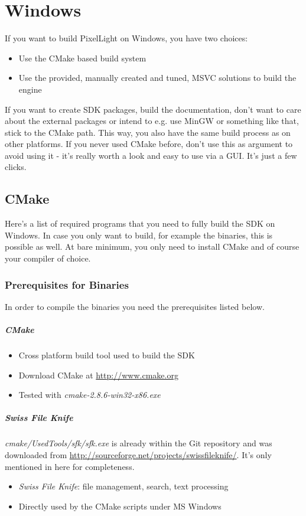 \chapter{Windows}
If you want to build PixelLight on Windows, you have two choices:
\begin{itemize}
\item{Use the CMake based build system}
\item{Use the provided, manually created and tuned, \ac{MSVC} solutions to build the engine}
\end{itemize}

If you want to create \ac{SDK} packages, build the documentation, don't want to care about the external packages or intend to e.g. use MinGW or something like that, stick to the CMake path. This way, you also have the same build process as on other platforms. If you never used CMake before, don't use this as argument to avoid using it - it's really worth a look and easy to use via a \ac{GUI}. It's just a few clicks.




\section{CMake}
Here's a list of required programs that you need to fully build the \ac{SDK} on Windows. In case you only want to build, for example the binaries, this is possible as well. At bare minimum, you only need to install CMake and of course your compiler of choice.



\subsection{Prerequisites for Binaries}
In order to compile the binaries you need the prerequisites listed below.


\paragraph{CMake}
\begin{itemize}
\item{Cross platform build tool used to build the \ac{SDK}}
\item{Download CMake at \url{http://www.cmake.org}}
\item{Tested with \emph{cmake-2.8.6-win32-x86.exe}}
\end{itemize}


\paragraph{Swiss File Knife}
\emph{cmake/UsedTools/sfk/sfk.exe} is already within the Git repository and was downloaded from \url{http://sourceforge.net/projects/swissfileknife/}. It's only mentioned in here for completeness.
\begin{itemize}
\item{\emph{Swiss File Knife}: file management, search, text processing}
\item{Directly used by the CMake scripts under \ac{MS} Windows}
\end{itemize}


